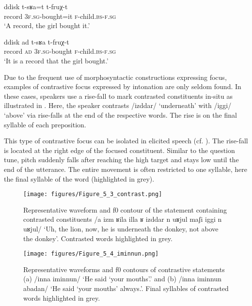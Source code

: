 \ea\label{ex:5:10}
\gll  ddisk	t-sʁa=t	t-fruχ-t \\
      record \textsc{3f.sg}-bought=it \textsc{f}-child.\textsc{bs-f.sg}\\
\glt ‘A record, the girl bought it.’
\z

\ea\label{ex:5:11}
\gll  ddisk ad t-sʁa t-fruχ-t  \\
      record \textsc{ad} \textsc{3f.sg}-bought \textsc{f}-child.\textsc{bs-f.sg}\\
\glt ‘It is a record that the girl bought.’
\z

Due to the frequent use of morphosyntactic constructions expressing focus, examples of contrastive focus expressed by intonation are only seldom found. In these cases, speakers use a rise-fall to mark contrasted constituents in-situ as illustrated in . Here, the speaker contrasts /izddar/ ‘underneath’ with /iggi/ ‘above’ via rise-falls at the end of the respective words. The rise is on the final syllable of each preposition.

This type of contrastive focus can be isolated in elicited speech (cf. ). The rise-fall is located at the right edge of the focused constituent. Similar to the question tune, pitch suddenly falls after reaching the high target and stays low until the end of the utterance. The entire movement is often restricted to one syllable, here the final syllable of the word (highlighted in grey).

\begin{figure}
  \centering 
   \texttt{[image: figures/Figure\_5\_3\_contrast.png]}
  \caption{Representative waveform and f0 contour of the statement containing contrasted constituents /a izm ʁila illa ʁ izddar n uʁjul maʃi iggi n uʁjul/ ‘Uh, the lion, now, he is underneath the donkey, not above the donkey’. Contrasted words highlighted in grey.}
   \label{fig:5.3}
   \end{figure}

  \begin{figure}
  \centering 
   \texttt{[image: figures/Figure\_5\_4\_iminnun.png]}
  \caption{Representative waveforms and f0 contours of contrastive statements (a) /inna iminnun/ ‘He said ‘your mouths’.’ and (b) /inna iminnun abadan/ ‘He said ‘your mouths’ always.’. Final syllables of contrasted words highlighted in grey. }
   \label{fig:5.4}
   \end{figure}

